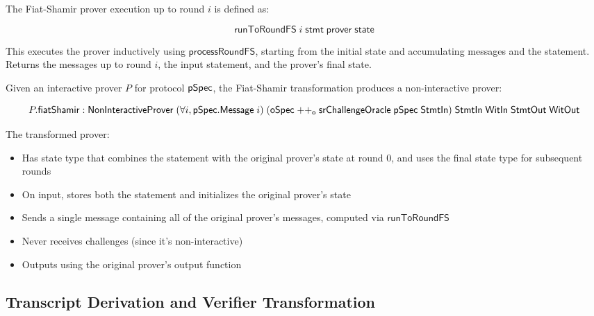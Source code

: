 \begin{definition}
    \label{def:prover_run_to_round_fs}
    The Fiat-Shamir prover execution up to round $i$ is defined as:

    \[ \mathsf{runToRoundFS} \;i \;\mathsf{stmt} \;\mathsf{prover} \;\mathsf{state} \]

    This executes the prover inductively using $\mathsf{processRoundFS}$, starting from the initial state and accumulating messages and the statement. Returns the messages up to round $i$, the input statement, and the prover's final state.
\end{definition}

\begin{definition}
    \label{def:prover_fiat_shamir}
    Given an interactive prover $P$ for protocol $\mathsf{pSpec}$, the Fiat-Shamir transformation produces a non-interactive prover:

    \[ P.\mathsf{fiatShamir} : \mathsf{NonInteractiveProver} \;(\forall i, \mathsf{pSpec}.\mathsf{Message} \;i) \;(\mathsf{oSpec} \mathrel{++_\mathsf{o}} \mathsf{srChallengeOracle} \;\mathsf{pSpec} \;\mathsf{StmtIn}) \;\mathsf{StmtIn} \;\mathsf{WitIn} \;\mathsf{StmtOut} \;\mathsf{WitOut} \]

    The transformed prover:
    \begin{itemize}
        \item Has state type that combines the statement with the original prover's state at round 0, and uses the final state type for subsequent rounds
        \item On input, stores both the statement and initializes the original prover's state
        \item Sends a single message containing all of the original prover's messages, computed via $\mathsf{runToRoundFS}$
        \item Never receives challenges (since it's non-interactive)
        \item Outputs using the original prover's output function
    \end{itemize}
\end{definition}

\subsection{Transcript Derivation and Verifier Transformation}\label{sec:fiat_shamir_verifier}


